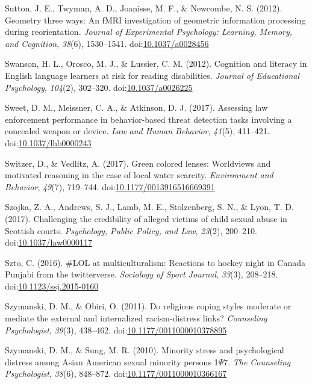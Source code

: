 \documentclass[english,man]{apa6}
\theoremstyle{definition}
\theoremstyle{definition}
\theoremstyle{definition}
\theoremstyle{remark}
\begin{document}
\hypertarget{ref-Sutton2012}{}
Sutton, J. E., Twyman, A. D., Joanisse, M. F., \& Newcombe, N. S.
(2012). Geometry three ways: An fMRI investigation of geometric
information processing during reorientation. \emph{Journal of
Experimental Psychology: Learning, Memory, and Cognition}, \emph{38}(6),
1530--1541.
doi:\href{https://doi.org/10.1037/a0028456}{10.1037/a0028456}

\hypertarget{ref-Swanson2012}{}
Swanson, H. L., Orosco, M. J., \& Lussier, C. M. (2012). Cognition and
literacy in English language learners at risk for reading disabilities.
\emph{Journal of Educational Psychology}, \emph{104}(2), 302--320.
doi:\href{https://doi.org/10.1037/a0026225}{10.1037/a0026225}

\hypertarget{ref-Sweet2017}{}
Sweet, D. M., Meissner, C. A., \& Atkinson, D. J. (2017). Assessing law
enforcement performance in behavior-based threat detection tasks
involving a concealed weapon or device. \emph{Law and Human Behavior},
\emph{41}(5), 411--421.
doi:\href{https://doi.org/10.1037/lhb0000243}{10.1037/lhb0000243}

\hypertarget{ref-Switzer2017}{}
Switzer, D., \& Vedlitz, A. (2017). Green colored lenses: Worldviews and
motivated reasoning in the case of local water scarcity.
\emph{Environment and Behavior}, \emph{49}(7), 719--744.
doi:\href{https://doi.org/10.1177/0013916516669391}{10.1177/0013916516669391}

\hypertarget{ref-Szojka2017}{}
Szojka, Z. A., Andrews, S. J., Lamb, M. E., Stolzenberg, S. N., \& Lyon,
T. D. (2017). Challenging the credibility of alleged victims of child
sexual abuse in Scottish courts. \emph{Psychology, Public Policy, and
Law}, \emph{23}(2), 200--210.
doi:\href{https://doi.org/10.1037/law0000117}{10.1037/law0000117}

\hypertarget{ref-Szto2016}{}
Szto, C. (2016). \#LOL at multiculturalism: Reactions to hockey night in
Canada Punjabi from the twitterverse. \emph{Sociology of Sport Journal},
\emph{33}(3), 208--218.
doi:\href{https://doi.org/10.1123/ssj.2015-0160}{10.1123/ssj.2015-0160}

\hypertarget{ref-Szymanski2011}{}
Szymanski, D. M., \& Obiri, O. (2011). Do religious coping styles
moderate or mediate the external and internalized racism-distress links?
\emph{Counseling Psychologist}, \emph{39}(3), 438--462.
doi:\href{https://doi.org/10.1177/0011000010378895}{10.1177/0011000010378895}

\hypertarget{ref-Szymanski2010}{}
Szymanski, D. M., \& Sung, M. R. (2010). Minority stress and
psychological distress among Asian American sexual minority persons
1\(\Psi\)7. \emph{The Counseling Psychologist}, \emph{38}(6), 848--872.
doi:\href{https://doi.org/10.1177/0011000010366167}{10.1177/0011000010366167}
\end{document}
